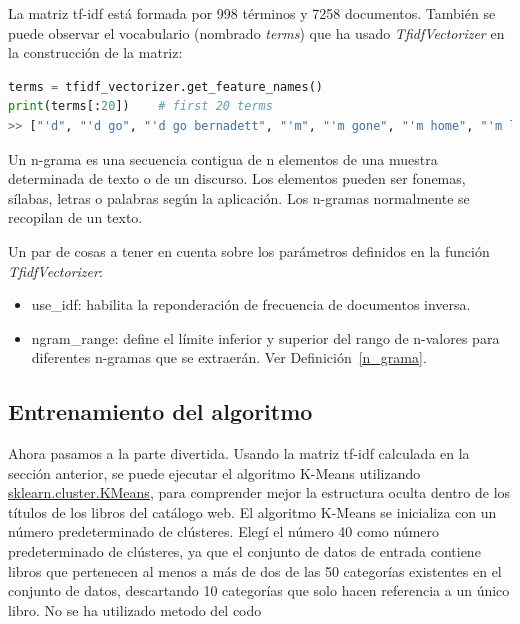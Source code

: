 \documentclass{uimppracticas}
\begin{document}
La matriz tf-idf está formada por 998 términos y 7258 documentos. También se puede observar el vocabulario (nombrado \textit{terms}) que ha usado \textit{TfidfVectorizer} en la construcción de la matriz:

\begin{lstlisting}[language=python]
terms = tfidf_vectorizer.get_feature_names()
print(terms[:20])    # first 20 terms
>> ["'d", "'d go", "'d go bernadett", "'m", "'m gone", "'m home", "'m lie", "'m lie tell", "'s", "'s alic", "'s alic wonderland", "'s astound", "'s astound stori", "'s autobiographi", "'s babi", "'s babi ice", "'s berlin", "'s call", "'s call cormoran", "'s childhood"]
\end{lstlisting}

\begin{definition}\label{n_grama}
Un n-grama es una secuencia contigua de n elementos de una muestra determinada de texto o de un discurso. Los elementos pueden ser fonemas, sílabas, letras o palabras según la aplicación. Los n-gramas normalmente se recopilan de un texto.
\end{definition}

Un par de cosas a tener en cuenta sobre los parámetros definidos en la función \textit{TfidfVectorizer}:

\begin{itemize}
	\item use\_idf: habilita la reponderación de frecuencia de documentos inversa.
	\item ngram\_range: define el límite inferior y superior del rango de n-valores para diferentes n-gramas que se extraerán. Ver Definición~\ref{n_grama}.
\end{itemize}

\subsection{Entrenamiento del algoritmo}

Ahora pasamos a la parte divertida. Usando la matriz tf-idf calculada en la sección anterior, se puede ejecutar el algoritmo K-Means utilizando \href{https://scikit-learn.org/stable/modules/generated/sklearn.cluster.KMeans.html}{sklearn.cluster.KMeans}, para comprender mejor la estructura oculta dentro de los títulos de los libros del catálogo web. El algoritmo K-Means se inicializa con un número predeterminado de clústeres. Elegí el número 40 como número predeterminado de clústeres, ya que el conjunto de datos de entrada contiene libros que pertenecen al menos a más de dos de las 50 categorías existentes en el conjunto de datos, descartando 10 categorías que solo hacen referencia a un único libro. No se ha utilizado metodo del codo
\end{document}
